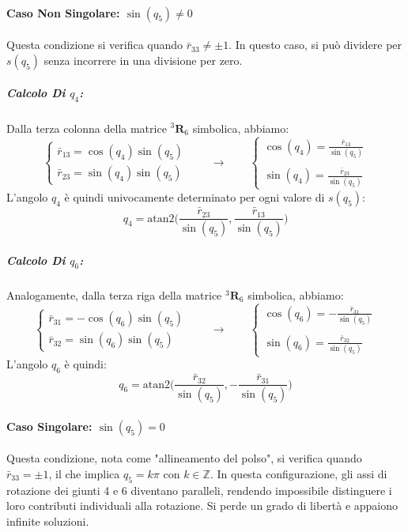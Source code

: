 ﻿\documentclass[11pt, a4paper]{article}
\begin{document}
\paragraph{Caso Non Singolare: $\sin(q_5) \neq 0$}
Questa condizione si verifica quando $\bar{r}_{33} \neq \pm 1$. In questo caso, si può dividere per $s(q_5)$ senza incorrere in una divisione per zero.

\subparagraph{Calcolo Di \(q_4\):}
Dalla terza colonna della matrice ${}^{3}\mathbf{R}_{6}$ simbolica, abbiamo:
\[
    \begin{cases}
        \bar{r}_{13} = \cos(q_{4})\sin(q_{5}) \\
        \bar{r}_{23} = \sin(q_{4})\sin(q_{5})
    \end{cases}
    \qquad\longrightarrow\qquad
    \begin{cases}
        \cos(q_{4}) = \displaystyle{\frac{\bar{r}_{13}}{\sin(q_5)}} \\
        \\
        \sin(q_{4}) = \displaystyle{\frac{\bar{r}_{23}}{\sin(q_5)}}
    \end{cases}
\]
L'angolo $q_{4}$ è quindi univocamente determinato per ogni valore di $s(q_5)$:
\begin{equation}
    \boxed{q_4 = \text{atan2}\biggl( \frac{\bar{r}_{23}}{\sin(q_5)}, \frac{\bar{r}_{13}}{\sin(q_5)} \biggr)}
\end{equation}

\subparagraph{Calcolo Di \(q_6\):}
Analogamente, dalla terza riga della matrice ${}^{3}\mathbf{R}_{6}$ simbolica, abbiamo:
\[
    \begin{cases}
        \bar{r}_{31} = -\cos(q_6)\sin(q_5) \\
        \bar{r}_{32} = \sin(q_6)\sin(q_5)
    \end{cases}
    \qquad\longrightarrow\qquad
    \begin{cases}
        \cos(q_{6}) = \displaystyle{-\frac{\bar{r}_{31}}{\sin(q_5)}} \\
        \\
        \sin(q_{6}) = \displaystyle{\frac{\bar{r}_{32}}{\sin(q_5)}}
    \end{cases}
\]
L'angolo $q_{6}$ è quindi:
\begin{equation}
    \boxed{q_6 = \text{atan2}\biggl( \frac{\bar{r}_{32}}{\sin(q_5)}, -\frac{\bar{r}_{31}}{\sin(q_5)} \biggr)}
\end{equation}

\paragraph{Caso Singolare: $\sin(q_5) = 0$}
Questa condizione, nota come "allineamento del polso", si verifica quando $\bar{r}_{33} = \pm 1$, il che implica $q_5 = k\pi$ con $k \in \mathbb{Z}$. In questa configurazione, gli assi di rotazione dei giunti 4 e 6 diventano paralleli, rendendo impossibile distinguere i loro contributi individuali alla rotazione. Si perde un grado di libertà e appaiono infinite soluzioni.
\end{document}
